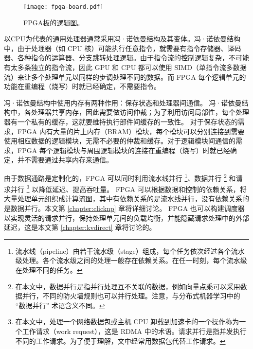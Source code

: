 \begin{figure}[htbp]
	\centering
	\texttt{[image: fpga-board.pdf]}
	\caption{FPGA板的逻辑图。}
	\label{clicknp:fig:fpga}
\end{figure}



以CPU为代表的通用处理器通常采用冯·诺依曼结构及其变体。冯·诺依曼结构中，由于处理器（如 CPU 核）可能执行任意指令，就需要有指令存储器、译码器、各种指令的运算器、分支跳转处理逻辑。由于指令流的控制逻辑复杂，不可能有太多条独立的指令流，因此 GPU 和 CPU 都可以使用 SIMD（单指令流多数据流）来让多个处理单元以同样的步调处理不同的数据。而 FPGA 每个逻辑单元的功能在重编程（烧写）时就已经确定，不需要指令。

冯·诺依曼结构中使用内存有两种作用：保存状态和处理器间通信。
冯·诺依曼结构中，各处理器共享内存，因此需要做访问仲裁；为了利用访问局部性，每个处理器有一个私有的缓存，这就要维持执行部件间缓存的一致性。
对于保存状态的需求，FPGA 内有大量的片上内存（BRAM）模块，每个模块可以分别连接到需要使用相应数据的逻辑模块，无需不必要的仲裁和缓存。对于逻辑模块间通信的需求，FPGA 每个逻辑模块与周围逻辑模块的连接在重编程（烧写）时就已经确定，并不需要通过共享内存来通信。




由于数据通路是定制化的，FPGA 可以同时利用流水线并行 \footnote{流水线（pipeline）由若干流水级（stage）组成，每个任务依次经过各个流水级处理。各个流水级之间的处理一般存在依赖关系。在任一时刻，每个流水级在处理不同的任务。}、数据并行 \footnote{在本文中，数据并行是指并行处理互不关联的数据，例如向量点乘可以采用数据并行，不同的防火墙规则也可以并行处理。注意，与分布式机器学习中的 ``数据并行'' 术语含义不同。} 和请求并行 \footnote{在本文中，处理一个网络数据包或主机 CPU 卸载到加速卡的一个操作称为一个工作请求（work request），这是 RDMA 中的术语。请求并行是指并发执行不同的工作请求。为了便于理解，文中经常用数据包代替工作请求。} 以降低延迟、提高吞吐量。
FPGA 可以根据数据和控制的依赖关系，将大量处理单元组织成计算流图，其中有依赖关系的是流水线并行，没有依赖关系的是数据并行。本文第 \ref{chapter:clicknp} 章将详细讨论。
FPGA 也可以构建调度器以实现灵活的请求并行，保持处理单元间的负载均衡，并能隐藏请求处理中的外部延迟，这是本文第 \ref{chapter:kvdirect} 章将讨论的。

